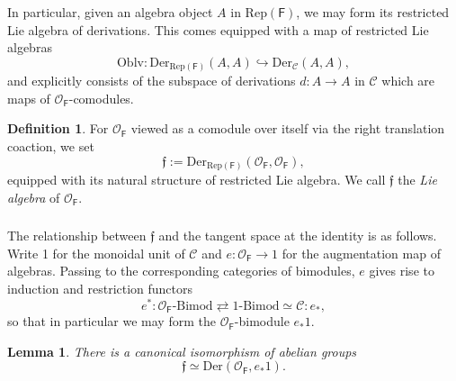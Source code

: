 \documentclass{amsart}
\newtheorem{Lem}[Thm]{Lemma}
\theoremstyle{definition}
\newtheorem{defi}[Thm]{Definition}
\newcommand{\RepF}{\Rep(\mathsf{F})}
\newcommand{\OOF}{\OO_{\mathsf{F}}}
\newcommand{\Rep}{\on{Rep}}
\newcommand{\sC}{\mathscr{C}}
\newcommand{\sss}{\subsubsection{}}
\newcommand{\OO}{\mathscr{O}}
\newcommand{\on}{\mathrm}
\newcommand{\ff}{\mathfrak{f}}
\numberwithin{equation}{section}
\begin{document}
In particular, given an algebra object $A$ in $\RepF$, we may form its restricted Lie algebra of derivations. This comes equipped with a map of restricted Lie algebras
$$\on{Oblv}: \on{Der}_{\RepF}(A,A) \hookrightarrow \on{Der}_{\sC}(A,A),$$
and explicitly consists of the subspace of derivations $d: A \rightarrow A$ in $\sC$ which are maps of $\OOF$-comodules. 

\begin{defi} For $\OOF$ viewed as a comodule over itself via the right translation coaction, we set 
$$\ff := \on{Der}_{\RepF}(\OOF, \OOF),$$equipped with its natural structure of restricted Lie algebra.    {We call $\ff$ the {\it Lie algebra} of $\OOF$}. 
\end{defi}


\sss The relationship between $\ff$ and the tangent space at the identity is as follows. Write 1 for the monoidal unit of $\sC$ and  $e: \OOF \rightarrow 1$ for the augmentation map of algebras. Passing to the corresponding categories of bimodules, $e$ gives rise to induction and restriction functors 
$$e^*: \OOF\text{-Bimod} \rightleftarrows 1\text{-Bimod} \simeq \sC: e_*,$$
so that in particular we may form the $\OOF$-bimodule $e_* 1$.


\begin{Lem} \label{l_LieAlg=TanSpace}There is a canonical isomorphism of abelian groups\label{l:restrid} 
$$\ff \simeq \on{Der}(\OOF, e_* 1).$$
\end{Lem}
\end{document}

